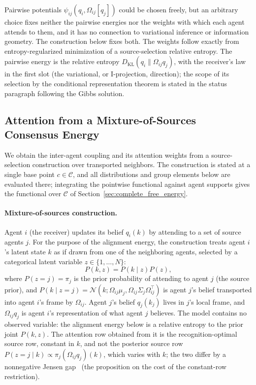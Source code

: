 \documentclass[11pt]{article}
\begin{document}
Pairwise potentials $\psi_{ij}(q_i, \Omega_{ij}[q_j])$ could be chosen freely, but an arbitrary choice fixes neither the pairwise energies nor the weights with which each agent attends to them, and it has no connection to variational inference or information geometry. The construction below fixes both. The weights follow exactly from entropy-regularized minimization of a source-selection relative entropy. The pairwise energy is the relative entropy $D_{\mathrm{KL}}(q_i\|\Omega_{ij}q_j)$, with the receiver's law in the first slot (the variational, or I-projection, direction); the scope of its selection by the conditional representation theorem is stated in the status paragraph following the Gibbs solution.

\subsection{Attention from a Mixture-of-Sources Consensus Energy}
\label{sec:mixture_derivation}

We obtain the inter-agent coupling and its attention weights from a source-selection construction over transported neighbors. The construction is stated at a single base point $c \in \mathcal{C}$, and all distributions and group elements below are evaluated there; integrating the pointwise functional against agent supports gives the functional over $\mathcal{C}$ of Section~\ref{sec:complete_free_energy}.

\paragraph{Mixture-of-sources construction.}
Agent $i$ (the receiver) updates its belief $q_i(k)$ by attending to a set of source agents $j$. For the purpose of the alignment energy, the construction treats agent $i$'s latent state $k$ as if drawn from one of the neighboring agents, selected by a categorical latent variable $z \in \{1, \ldots, N\}$:
\begin{equation}
P(k, z) = P(k \mid z) P(z),
\label{eq:mixture_joint}
\end{equation}
where $P(z = j) = \pi_j$ is the prior probability of attending to agent $j$ (the source prior), and $P(k \mid z = j) = \mathcal{N}(k; \Omega_{ij}\mu_j, \Omega_{ij}\Sigma_j\Omega_{ij}^\top)$ is agent $j$'s belief transported into agent $i$'s frame by $\Omega_{ij}$. Agent $j$'s belief $q_j(k_j)$ lives in $j$'s local frame, and $\Omega_{ij}q_j$ is agent $i$'s representation of what agent $j$ believes. The model contains no observed variable: the alignment energy below is a relative entropy to the prior joint $P(k,z)$. The attention row obtained from it is the recognition-optimal source row, constant in $k$, and not the posterior source row $P(z = j \mid k) \propto \pi_j (\Omega_{ij}q_j)(k)$, which varies with $k$; the two differ by a nonnegative Jensen gap~\cite[Ch.~6]{DennisGaugeVFE2026} (the proposition on the cost of the constant-row restriction).
\end{document}
